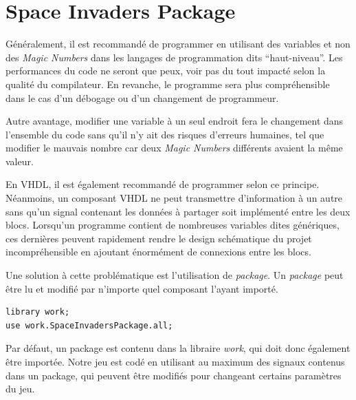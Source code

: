 \documentclass[french]{nakrule}
\begin{document}
\clearpage


\section{Space Invaders Package}
\label{sec:package}

Généralement, il est recommandé de programmer en utilisant des variables et non
des \emph{Magic Numbers} dans les langages de programmation dits
``haut-niveau''. Les performances du code ne seront que peux, voir pas du tout
impacté selon la qualité du compilateur. En revanche, le programme sera plus
compréhensible dans le cas d'un débogage ou d'un changement de programmeur.

Autre avantage, modifier une variable à un seul endroit fera le changement dans
l'ensemble du code sans qu'il n'y ait des risques d'erreurs humaines, tel que
modifier le mauvais nombre car deux \emph{Magic Numbers} différents avaient la
même valeur.

En VHDL, il est également recommandé de programmer selon ce principe. Néanmoins,
un composant VHDL ne peut transmettre d'information à un autre sans qu'un signal
contenant les données à partager soit implémenté entre les deux blocs. Lorsqu'un
programme contient de nombreuses variables dites génériques, ces dernières peuvent
rapidement rendre le design schématique du projet incompréhensible en ajoutant
énormément de connexions entre les blocs.

Une solution à cette problématique est l'utilisation de \emph{package}. Un
\emph{package} peut être lu et modifié par n'importe quel composant l'ayant
importé.
\begin{lstlisting}[style=vhdl, caption=Importation d'un package]
library work;
use work.SpaceInvadersPackage.all;
\end{lstlisting}

Par défaut, un package est contenu dans la libraire \emph{work}, qui doit donc
également être importée. Notre jeu est codé en utilisant au maximum des signaux
contenus dans un package, qui peuvent être modifiés pour changeant certains
paramètres du jeu.
\end{document}
